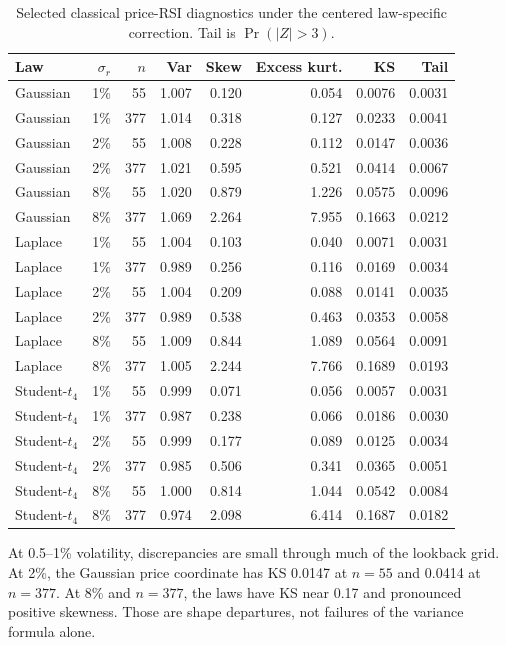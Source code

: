 \documentclass[10pt]{article}
\begin{document}
\begin{table}[ht]
\centering\scriptsize
\caption{Selected classical price-RSI diagnostics under the centered law-specific correction. Tail is $\Pr(|Z|>3)$.}\label{tab:selected}
\begin{tabular}{lrrrrrrr}\toprule
Law & $\sigma_r$ & $n$ & Var & Skew & Excess kurt. & KS & Tail\\\midrule
Gaussian & 1\% & 55 & 1.007 & 0.120 & 0.054 & 0.0076 & 0.0031\\
Gaussian & 1\% & 377 & 1.014 & 0.318 & 0.127 & 0.0233 & 0.0041\\
Gaussian & 2\% & 55 & 1.008 & 0.228 & 0.112 & 0.0147 & 0.0036\\
Gaussian & 2\% & 377 & 1.021 & 0.595 & 0.521 & 0.0414 & 0.0067\\
Gaussian & 8\% & 55 & 1.020 & 0.879 & 1.226 & 0.0575 & 0.0096\\
Gaussian & 8\% & 377 & 1.069 & 2.264 & 7.955 & 0.1663 & 0.0212\\
Laplace & 1\% & 55 & 1.004 & 0.103 & 0.040 & 0.0071 & 0.0031\\
Laplace & 1\% & 377 & 0.989 & 0.256 & 0.116 & 0.0169 & 0.0034\\
Laplace & 2\% & 55 & 1.004 & 0.209 & 0.088 & 0.0141 & 0.0035\\
Laplace & 2\% & 377 & 0.989 & 0.538 & 0.463 & 0.0353 & 0.0058\\
Laplace & 8\% & 55 & 1.009 & 0.844 & 1.089 & 0.0564 & 0.0091\\
Laplace & 8\% & 377 & 1.005 & 2.244 & 7.766 & 0.1689 & 0.0193\\
Student-$t_4$ & 1\% & 55 & 0.999 & 0.071 & 0.056 & 0.0057 & 0.0031\\
Student-$t_4$ & 1\% & 377 & 0.987 & 0.238 & 0.066 & 0.0186 & 0.0030\\
Student-$t_4$ & 2\% & 55 & 0.999 & 0.177 & 0.089 & 0.0125 & 0.0034\\
Student-$t_4$ & 2\% & 377 & 0.985 & 0.506 & 0.341 & 0.0365 & 0.0051\\
Student-$t_4$ & 8\% & 55 & 1.000 & 0.814 & 1.044 & 0.0542 & 0.0084\\
Student-$t_4$ & 8\% & 377 & 0.974 & 2.098 & 6.414 & 0.1687 & 0.0182\\
\bottomrule\end{tabular}
\end{table}

At 0.5--1\% volatility, discrepancies are small through much of the lookback grid. At 2\%, the Gaussian price coordinate has KS 0.0147 at $n=55$ and 0.0414 at $n=377$. At 8\% and $n=377$, the laws have KS near 0.17 and pronounced positive skewness. Those are shape departures, not failures of the variance formula alone.
\end{document}
